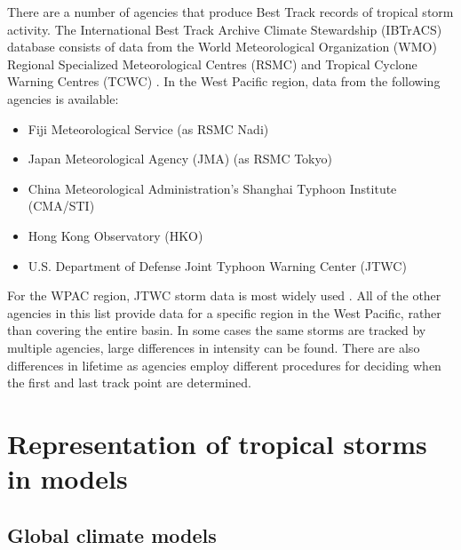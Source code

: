There are a number of agencies that produce Best Track records of tropical storm activity. The  International Best Track Archive Climate Stewardship (IBTrACS)\citep{knapp2010international} database consists of data from the World Meteorological Organization (WMO) Regional Specialized Meteorological Centres (RSMC) and Tropical Cyclone Warning Centres (TCWC) \citep{knapp2010international}. In the West Pacific region, data from the following agencies is available:

\begin{itemize}
	\item Fiji Meteorological Service (as RSMC Nadi)
	\item Japan Meteorological Agency (JMA) (as RSMC Tokyo)
	\item China Meteorological Administration’s Shanghai Typhoon Institute (CMA/STI)
	\item Hong Kong Observatory (HKO)
	\item U.S. Department of Defense Joint Typhoon Warning Center (JTWC)
\end{itemize}

For the WPAC region, JTWC storm data is most widely used \citep{knapp2010international}. All of the other agencies in this list provide data for a specific region in the West Pacific, rather than covering the entire basin. In some cases the same storms are tracked by multiple agencies, large differences in intensity can be found. There are also differences in lifetime as agencies employ different procedures for deciding when the first and last track point are determined.



\section{Representation of tropical storms in models}

\subsection{Global climate models}

